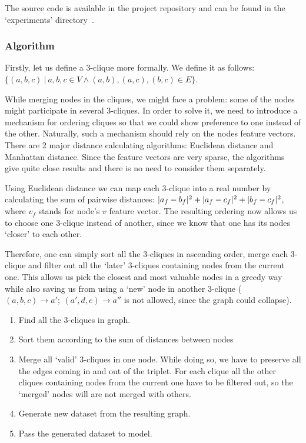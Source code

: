 The source code is available in the project repository and can be found in the `experiments' directory~\cite{3clique_ins_experiment}.

\subsubsection*{Algorithm}

Firstly, let us define a 3-clique more formally.
We define it as follows: $
	\{ \left(a, b, c\right)\
	\lvert\ a, b, c \in V \wedge
	\left(a, b\right),
	\left(a, c\right),
	\left(b, c\right) \in E \} $.

While merging nodes in the cliques, we might face a problem: some of the nodes might participate in several 3-cliques.
In order to solve it, we need to introduce a mechanism for ordering cliques so that we could show preference to one instead of the other.
Naturally, such a mechanism should rely on the nodes feature vectors.
There are 2 major distance calculating algorithms: Euclidean distance and Manhattan distance.
Since the feature vectors are very sparse, the algorithms give quite close results and there is no need to consider them separately.

Using Euclidean distance we can map each 3-clique into a real number by calculating the sum of pairwise distances: $\lvert a_f - b_f \rvert^2 + \lvert a_f - c_f \rvert^2 + \lvert b_f - c_f \rvert^2$, where $v_f$ stands for node's $v$ feature vector.
The resulting ordering now allows us to choose one 3-clique instead of another, since we know that one has its nodes `closer' to each other.

Therefore, one can simply sort all the 3-cliques in ascending order, merge each 3-clique and filter out all the `later' 3-cliques containing nodes from the current one.
This allows us pick the closest and most valuable nodes in a greedy way while also saving us from using a `new' node in another 3-clique ($(a, b, c) \rightarrow a';\ (a', d, e) \rightarrow a''$ is not allowed, since the graph could collapse).

\begin{enumerate}
	\item Find all the 3-cliques in graph.
	\item Sort them according to the sum of distances between nodes
	\item Merge all `valid' 3-cliques in one node. While doing so, we have to preserve all the edges coming in and out of the triplet. For each clique all the other cliques containing nodes from the current one have to be filtered out, so the `merged' nodes will are not merged with others.
	\item Generate new dataset from the resulting graph.
	\item Pass the generated dataset to model.
\end{enumerate}

